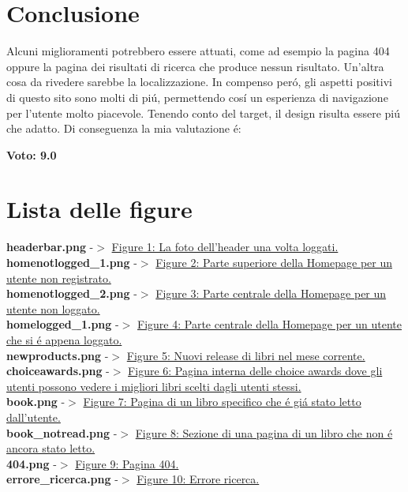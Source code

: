 \documentclass[12pt]{article}
\begin{document}
\section{Conclusione}

Alcuni miglioramenti potrebbero essere attuati, come ad esempio la pagina 404 oppure la pagina dei risultati di ricerca che produce nessun risultato. Un'altra cosa da rivedere sarebbe la localizzazione. In compenso per\'o, gli aspetti positivi di questo sito sono molti di pi\'u, permettendo cos\'i un esperienza di navigazione per l'utente molto piacevole. Tenendo conto del target, il design risulta essere pi\'u che adatto. Di conseguenza la mia valutazione \'e:

\begin{center}
	{\LARGE \textbf{\textbf{Voto: 9.0}}}
\end{center}
\newpage


\section{Lista delle figure}

\textbf{headerbar.png} -$>$ \href{https://goodreads.com}{Figure 1: La foto dell'header una volta loggati.} \\
\textbf{homenotlogged\_1.png} -$>$ \href{https://goodreads.com}{Figure 2: Parte superiore della Homepage per un utente non registrato.} \\
\textbf{homenotlogged\_2.png} -$>$ \href{https://goodreads.com}{Figure 3: Parte centrale della Homepage per un utente non loggato.
}\\
\textbf{homelogged\_1.png} -$>$ \href{https://goodreads.com}{Figure 4: Parte centrale della Homepage per un utente che si \'e appena loggato.
}\\
\textbf{newproducts.png} -$>$ \href{https://www.goodreads.com/new_releases/2017/5}{Figure 5: Nuovi release di libri nel mese corrente.} \\
\textbf{choiceawards.png} -$>$ \href{https://www.goodreads.com/choiceawards/best-books-2016}{Figure 6: Pagina interna delle choice awards dove gli utenti possono vedere i migliori libri scelti dagli utenti stessi.
}\\
\textbf{book.png} -$>$ \href{https://www.goodreads.com/book/show/23257231-the-amber-keeper}{Figure 7: Pagina di un libro specifico che \'e gi\'a stato letto dall'utente.}\\
\textbf{book\_notread.png} -$>$ \href{https://www.goodreads.com/book/show/62823.After_the_Banquet}{Figure 8: Sezione di una pagina di un libro che non \'e ancora stato letto.
}\\
\textbf{404.png} -$>$ \href{https://www.goodreads.com/23333324234234342dss}{Figure 9: Pagina 404.}\\
\textbf{errore\_ricerca.png} -$>$ \href{https://www.goodreads.com/search?q=asdasdsdew2323}{Figure 10: Errore ricerca.}
\end{document}
